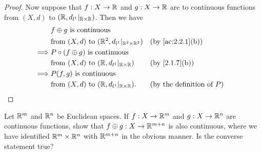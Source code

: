 \begin{proof}
  Now suppose that \(f : X \to \mathbb{R}\) and \(g : X \to \mathbb{R}\) are to continuous functions from \((X, d)\) to \((\mathbb{R}, d_{l^1}|_{\mathbb{R} \times \mathbb{R}})\).
  Then we have
  \begin{align*}
             & f \oplus g \text{ is continuous }                                                                            \\
             & \text{from } (X, d) \text{ to } (\R^2, d_{l^1}|_{\R^2 \times \R^2}) &  & \text{(by \cref{ac:2.2.1}(b))}      \\
    \implies & P \circ (f \oplus g) \text{ is continuous }                                                                  \\
             & \text{from } (X, d) \text{ to } (\R, d_{l^1}|_{\R \times \R})       &  & \text{(by \cref{2.1.7}(b))}         \\
    \implies & P(f, g) \text{ is continuous }                                                                               \\
             & \text{from } (X, d) \text{ to } (\R, d_{l^1}|_{\R \times \R}).      &  & \text{(by the definition of \(P\))}
  \end{align*}
\end{proof}

\begin{ex}\label{ex:2.2.6}
  Let \(\mathbb{R}^m\) and \(\mathbb{R}^n\) be Euclidean spaces.
  If \(f : X \to \mathbb{R}^m\) and \(g : X \to \mathbb{R}^n\) are continuous functions, show that \(f \oplus g : X \to \mathbb{R}^{m + n}\) is also continuous, where we have identified \(\mathbb{R}^m \times \mathbb{R}^n\) with \(\mathbb{R}^{m + n}\) in the obvious manner.
  Is the converse statement true?
\end{ex}

